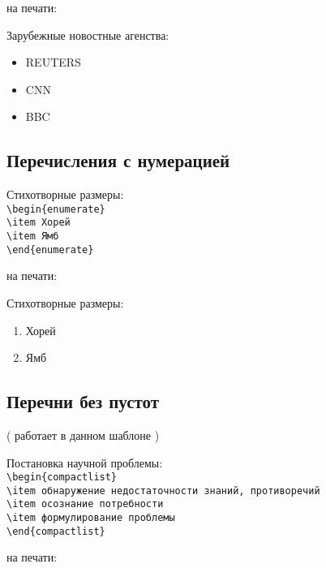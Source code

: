 на печати:

Зарубежные новостные агенства:
\begin{itemize}
\item REUTERS
\item CNN
\item BBC
\end{itemize}

\subsection{Перечисления с нумерацией}

Стихотворные размеры:\\
\verb|\begin{enumerate}|\\
\verb|\item Хорей|\\
\verb|\item Ямб|\\
\verb|\end{enumerate}|\\

\begin{minipage}{\textwidth}
на печати:

Стихотворные размеры:
\begin{enumerate}
\item Хорей
\item Ямб
\end{enumerate}
\end{minipage}

\subsection{Перечни без пустот}

( работает в данном шаблоне )

\smallskip
Постановка научной проблемы:\\
\verb|\begin{compactlist}|\\
\verb|\item обнаружение недостаточности знаний, противоречий|\\
\verb|\item осознание потребности|\\
\verb|\item формулирование проблемы|\\
\verb|\end{compactlist}|

\medskip
на печати:

